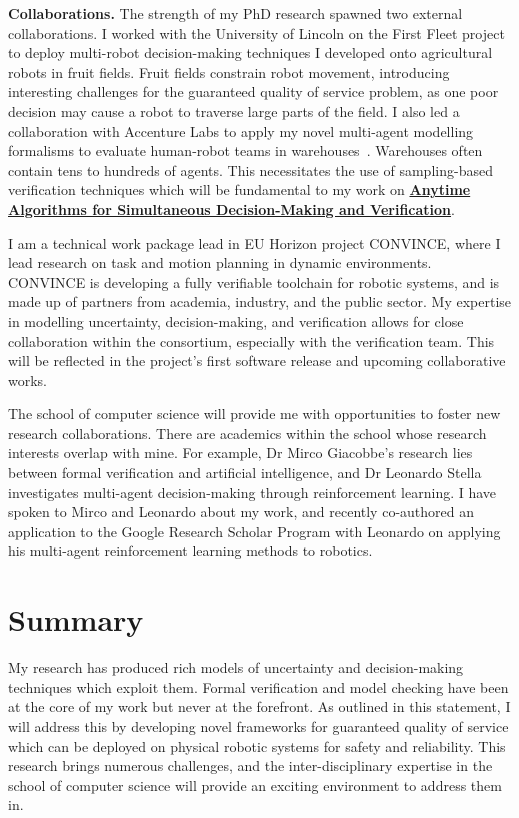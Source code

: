 \documentclass[12pt]{article}
\newcommand{\anytime}{\hyperlink{topicthree}{\textbf{Anytime Algorithms for Simultaneous Decision-Making and Verification}}}
\begin{document}
\vspace*{1ex}\noindent\textbf{Collaborations.} The strength of my PhD research spawned two external collaborations.
%
I worked with the University of Lincoln on the First Fleet project to deploy multi-robot decision-making techniques I developed onto agricultural robots in fruit fields.
%
Fruit fields constrain robot movement, introducing interesting challenges for the guaranteed quality of service problem, as one poor decision may cause a robot to traverse large parts of the field.
%
I also led a collaboration with Accenture Labs to apply my novel multi-agent modelling formalisms to evaluate human-robot teams in warehouses~\cite{street2022context,street2023analysing}.
%
Warehouses often contain tens to hundreds of agents.
%
This necessitates the use of sampling-based verification techniques which will be fundamental to my work on \anytime. 


I am a technical work package lead in EU Horizon project CONVINCE, where I lead research on task and motion planning in dynamic environments.
%
CONVINCE is developing a fully verifiable toolchain for robotic systems, and is made up of partners from academia, industry, and the public sector.
%
My expertise in modelling uncertainty, decision-making, and verification allows for close collaboration within the consortium, especially with the verification team.
%
This will be reflected in the project's first software release and upcoming collaborative works.

The school of computer science will provide me with opportunities to foster new research collaborations.
%
There are academics within the school whose research interests overlap with mine.
%
For example, Dr Mirco Giacobbe's research lies between formal verification and artificial intelligence, and Dr Leonardo Stella investigates multi-agent decision-making through reinforcement learning.
%
I have spoken to Mirco and Leonardo about my work, and recently co-authored an application to the Google Research Scholar Program with Leonardo on applying his multi-agent reinforcement learning methods to robotics.


\section*{Summary}

My research has produced rich models of uncertainty and decision-making techniques which exploit them.
%
Formal verification and model checking have been at the core of my work but never at the forefront.
%
As outlined in this statement, I will address this by developing novel frameworks for guaranteed quality of service which can be deployed on physical robotic systems for safety and reliability.
%
This research brings numerous challenges, and the inter-disciplinary expertise in the school of computer science will provide an exciting environment to address them in.

\printbibliography
\end{document}
